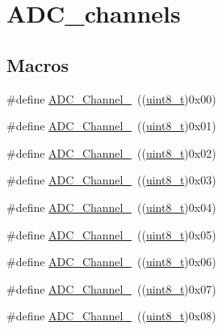 \hypertarget{group___a_d_c__channels}{}\section{A\+D\+C\+\_\+channels}
\label{group___a_d_c__channels}
\subsection*{Macros}
\begin{DoxyCompactItemize}
\item 
\#define \hyperlink{group___a_d_c__channels_ga40ec353803e9470a5721ef5bf0b1ab24}{A\+D\+C\+\_\+\+Channel\+\_}~((\hyperlink{_p_e___types_8h_aba7bc1797add20fe3efdf37ced1182c5}{uint8\+\_\+t})0x00)
\item 
\#define \hyperlink{group___a_d_c__channels_ga0b04cebf8d62085eca6dc7daa3d5d3f0}{A\+D\+C\+\_\+\+Channel\+\_}~((\hyperlink{_p_e___types_8h_aba7bc1797add20fe3efdf37ced1182c5}{uint8\+\_\+t})0x01)
\item 
\#define \hyperlink{group___a_d_c__channels_gabc66e2529583e11b591efd2df7070571}{A\+D\+C\+\_\+\+Channel\+\_}~((\hyperlink{_p_e___types_8h_aba7bc1797add20fe3efdf37ced1182c5}{uint8\+\_\+t})0x02)
\item 
\#define \hyperlink{group___a_d_c__channels_ga9f93cbacd030f1c79f96f8889b0cdee6}{A\+D\+C\+\_\+\+Channel\+\_}~((\hyperlink{_p_e___types_8h_aba7bc1797add20fe3efdf37ced1182c5}{uint8\+\_\+t})0x03)
\item 
\#define \hyperlink{group___a_d_c__channels_gafc7218417f729659dd8f06185cc2eafa}{A\+D\+C\+\_\+\+Channel\+\_}~((\hyperlink{_p_e___types_8h_aba7bc1797add20fe3efdf37ced1182c5}{uint8\+\_\+t})0x04)
\item 
\#define \hyperlink{group___a_d_c__channels_ga42822abae41faabde2a2da877e0cc854}{A\+D\+C\+\_\+\+Channel\+\_}~((\hyperlink{_p_e___types_8h_aba7bc1797add20fe3efdf37ced1182c5}{uint8\+\_\+t})0x05)
\item 
\#define \hyperlink{group___a_d_c__channels_ga7e24a73eec4aeb7d8e2f9008825ceacb}{A\+D\+C\+\_\+\+Channel\+\_}~((\hyperlink{_p_e___types_8h_aba7bc1797add20fe3efdf37ced1182c5}{uint8\+\_\+t})0x06)
\item 
\#define \hyperlink{group___a_d_c__channels_ga9723aa5fe6b9f4af1ffd3b90e6eef8d1}{A\+D\+C\+\_\+\+Channel\+\_}~((\hyperlink{_p_e___types_8h_aba7bc1797add20fe3efdf37ced1182c5}{uint8\+\_\+t})0x07)
\item 
\#define \hyperlink{group___a_d_c__channels_ga99b2c662d4068152e0e80a048036cc48}{A\+D\+C\+\_\+\+Channel\+\_}~((\hyperlink{_p_e___types_8h_aba7bc1797add20fe3efdf37ced1182c5}{uint8\+\_\+t})0x08)

\end{DoxyCompactItemize}
